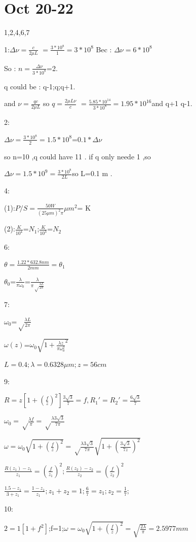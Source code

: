 \documentclass{article}
\begin{document}
\section{Oct 20-22}
1,2,4,6,7

1:$\Delta \nu = \frac{c}{2\mu L}$ $ = \frac{3*10^8}{1}=3*10^8$ Bec : $\Delta \nu = 6*10^8 $ 

So : $n=\frac{\Delta \nu}{3*10^8}$=2.

q could be : q-1;q;q+1.

and
$\nu = \frac{qc}{2\mu L}$ so $ q=\frac{2\mu L\nu}{c}$ $=\frac{5.85*10^{14}}{3*10^8}=1.95*10^{16}$and q+1 q-1.

2:

$\Delta \nu = \frac{3*10^8}{2}=1.5*10^8$=$0.1*\Delta \nu$

so n=10 ,q could have 11 . if q only neede 1 ,so 

$\Delta \nu = 1.5*10^9=\frac{3*10^8}{2L}$so L=0.1 m .

4:

(1):$P/S=\frac{50W}{(25\mu m)^2\pi}{\mu m}^2$= K

(2):$\frac{K}{10^4}$=$N_1$;$\frac{K}{10^3}$=$N_2$

6:

$\theta=\frac{1.22*632.8nm}{2mm}=\theta_1$

$\theta_0$=$\frac{\lambda}{\pi \omega_0}$=$\frac{\lambda}{\pi \sqrt\frac{\lambda L}{2\pi}}$

7:

$\omega_0$=$\sqrt\frac{\lambda L}{2\pi}$

$\omega (z)$=$\omega_0\sqrt{1+{\frac{\lambda z}{\pi \omega_0 ^2}^2}}$

$L=0.4;\lambda=0.6328\mu m ;z=56 cm $

9:

$R=z[1+(\frac fz)^2]$$\frac{3\sqrt3}7=f,R_1'=R_2'=\frac{6\sqrt3}{7}$

$\omega_0=\sqrt\frac{\lambda f}{\pi}=\sqrt\frac{\lambda 3\sqrt3}{7\pi}$

$\omega=\omega_0\sqrt{1+(\frac fz)^2}=\sqrt\frac{\lambda 3\sqrt3}{7\pi}\sqrt{1+(\frac {3\sqrt3}{7z} )^2}$

$\frac{R(z_1)-z_1}{z_1}=(\frac f{z_1})^2;\frac{R(z_2)-z_2}{z_2}=(\frac f{z_2})^2$

$\frac{1.5-z_1}{3+z_1}=\frac{1-z_1}{z_1};z_1+z_2=1;\frac67=z_1;z_2=\frac17;$

10:

$2=1[1+ f^2]$;f=1;$\omega=\omega_0\sqrt{1+(\frac fz)^2}=\sqrt{\frac{2\lambda}{\pi}}=2.5977mm$
\end{document}
